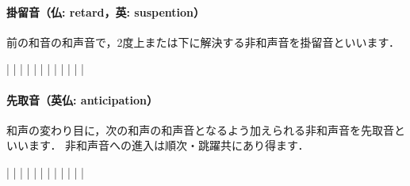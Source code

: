 \documentclass[dvipdfmx,uplatex,b5paper,openany,jbase=12Q,nomag*,textwidth-limit=44%
               ]{gachimuchi}
\begin{document}
\paragraph{掛留音（仏: retard，英: suspention）}
前の和音の和声音で，2度上または下に解決する非和声音を掛留音といいます．
\begin{Music}
  \generalmeter{\meterC}%
  \Startpiece%
  \NOTes%
  |%
  \en\NOtes
  |%
  \en\doublebar%
  \NOTes%
  |%
  \en\NOtes
  |%
  \en\doublebar%
  \NOTes%
  |%
  \en\NOtes
  |%
  \en\doublebar%
  \NOTes%
  |%
  \en\NOtes
  |%
  \en\doublebar%
  \NOTes%
  |%
  \en\NOtes
  |%
  \en\doublebar%
  \NOTes%
  |%
  \en\NOtes
  |%
  \en\setdoublebar%
  \endpiece%
\end{Music}

\paragraph{先取音（英仏: anticipation）}
和声の変わり目に，次の和声の和声音となるよう加えられる非和声音を先取音といいます．
非和声音への進入は順次・跳躍共にあり得ます．
\begin{Music}
  \generalmeter{\meterC}%
  \Startpiece%
  \NOtes%
  |\zchordsu{\Cross}%
  \en\NOTes%
  |%
  \en\doublebar%
  \NOtes%
  |\zchordsu{\Cross}%
  \en\NOTes%
  |%
  \en\doublebar%
  \NOtes%
  |\zchordsu{\Cross}%
  \en\NOTes%
  |%
  \en\doublebar%
  \NOtes%
  |\zchordsu{\Cross}%
  \en\NOTes%
  |%
  \en\doublebar%
  \NOtes%
  |\zchordsu{\Cross}%
  \en\NOTes%
  |%
  \en\doublebar%
  \NOtes%
  |\zchordsu{\Cross}%
  \en\NOTes%
  |%
  \en\setdoublebar%
  \endpiece%
\end{Music}
\end{document}
